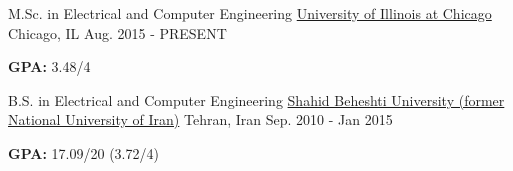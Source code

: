 
\begin{cventries}

  \cventry
    {M.Sc. in Electrical and Computer Engineering} %
    {\href{http://www.uic.edu}{University of Illinois at Chicago}} %
    {Chicago, IL} %
    {Aug. 2015 - PRESENT} %
   {
      \begin{cvitems} %
        \item {\textbf{GPA:} 3.48/4}
      \end{cvitems}
    }
\end{cventries}
\begin{cventries}

  \cventry
    {B.S. in Electrical and Computer Engineering} %
    {\href{http://en.sbu.ac.ir/}{Shahid Beheshti University (former National University of Iran)}} %
    {Tehran, Iran} %
    {Sep. 2010 - Jan 2015} %
   {
      \begin{cvitems} %
        \item {\textbf{GPA:} 17.09/20 (3.72/4)}
      \end{cvitems}
    }

\end{cventries}
